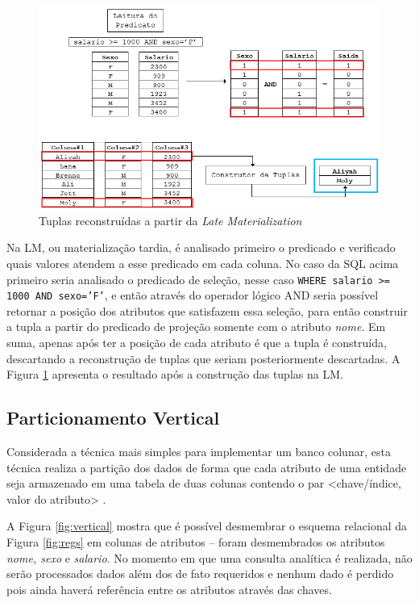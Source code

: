 \begin{figure}[htpb]
	\centering
        \includegraphics[width=14cm]{lm}
	\caption{Tuplas reconstruídas a partir da \textit{Late Materialization}}
	\label{fig:lm}
\end{figure}

Na LM, ou materialização tardia, é analisado primeiro o predicado e verificado quais valores atendem a esse predicado em cada coluna. 
No caso da SQL acima primeiro seria analisado o predicado de seleção, nesse caso \texttt{WHERE salario >= 1000 AND sexo='F'}, e então 
através do operador lógico AND seria possível retornar a posição dos atributos que satisfazem essa seleção, para então 
construir a tupla a partir do predicado de projeção somente com o atributo \textit{nome}. Em suma, apenas após ter a posição de cada atributo é que a tupla é construída, descartando a reconstrução de tuplas que seriam posteriormente descartadas. A Figura \ref{fig:lm} apresenta o resultado após a construção das tuplas na LM.


\subsection{Particionamento Vertical}

Considerada a técnica mais simples para implementar um banco colunar, esta técnica 
realiza a partição dos dados de forma que cada atributo de uma entidade seja armazenado 
em uma tabela de duas colunas contendo o par <chave/índice, valor do atributo> \cite{khoshafian1987query}.


A Figura \ref{fig:vertical} mostra que é possível desmembrar o esquema relacional da Figura \ref{fig:regs} em colunas de atributos -- foram desmembrados os atributos \textit{nome, sexo} e \textit{salario}. 
No momento em que uma consulta analítica é realizada, não serão processados dados além 
dos de fato requeridos e nenhum dado é perdido pois ainda haverá referência entre os atributos 
através das chaves.

